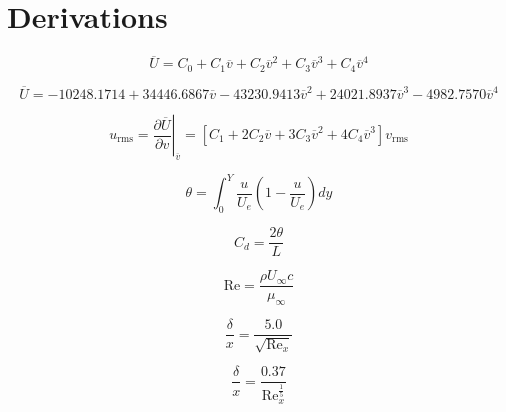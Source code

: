 \section{Derivations}\label{sec:derivations}

\citep{lab7-manual}

\begin{equation} \label{eq:calibration_polynomial_general}
    \overline{U} = C_0 + C_1\overline{v} + C_2\overline{v}^2 + C_3\overline{v}^3 + C_4\overline{v}^4
\end{equation}

\begin{equation} \label{eq:calibration_polynomial}
    \overline{U} = \num{-10248.1714} + \num{34446.6867}\overline{v} - \num{43230.9413}\overline{v}^2 + \num{24021.8937}\overline{v}^3 - \num{4982.7570}\overline{v}^4
\end{equation}

\begin{equation} \label{eq:u_rms}
    u_\text{rms} = \left. \frac{\partial \overline{U}}{\partial v}\right|_{\overline{v}} = \left[C_1 + 2C_2\overline{v} + 3C_3\overline{v}^2 + 4C_4\overline{v}^3\right]v_\text{rms}
\end{equation}

\begin{equation} \label{eq:momentum_thickness}
    \theta = \int_0^Y\frac{u}{U_e}\left(1 - \frac{u}{U_e}\right)dy
\end{equation}

\begin{equation} \label{eq:C_d}
    C_d = \frac{2\theta}{L}
\end{equation}

\begin{equation} \label{eq:reynolds}
    \text{Re} = \frac{\rho U_\infty c}{\mu_\infty}
\end{equation}

\begin{equation} \label{eq:boundary_layer_laminar}
    \frac{\delta}{x} = \frac{5.0}{\sqrt{\text{Re}_x}}
\end{equation}

\begin{equation} \label{eq:boundary_layer_turbulent}
    \frac{\delta}{x} = \frac{0.37}{\text{Re}_x^\frac{1}{5}}
\end{equation}
